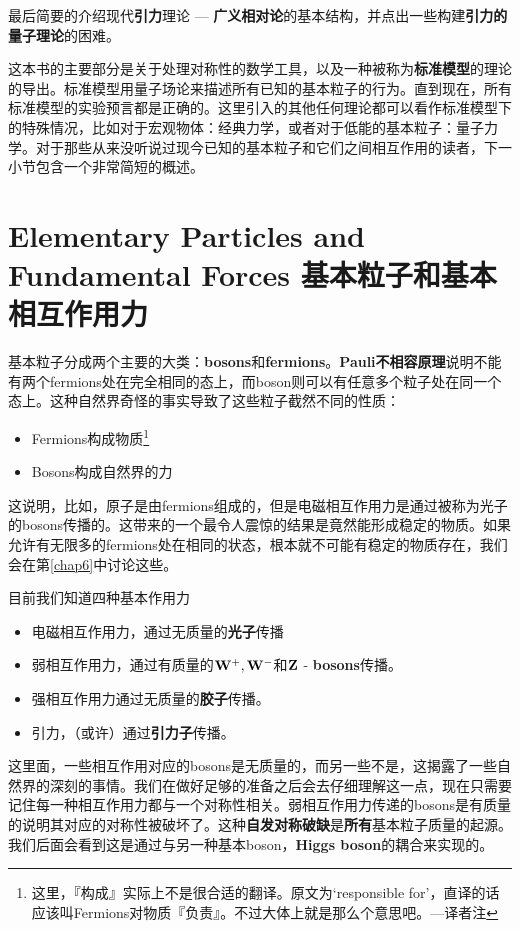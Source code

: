 最后简要的介绍现代{\bf 引力}理论 --- {\bf 广义相对论}的基本结构，并点出一些构建{\bf 引力的量子理论}的困难。

这本书的主要部分是关于处理对称性的数学工具，以及一种被称为{\bf 标准模型}的理论的导出。标准模型用量子场论来描述所有已知的基本粒子的行为。直到现在，所有标准模型的实验预言都是正确的。这里引入的其他任何理论都可以看作标准模型下的特殊情况，比如对于宏观物体：经典力学，或者对于低能的基本粒子：量子力学。对于那些从来没听说过现今已知的基本粒子和它们之间相互作用的读者，下一小节包含一个非常简短的概述。

\section[基本粒子和基本相互作用力]{Elementary Particles and Fundamental Forces 基本粒子和基本相互作用力}\label{sec1.3}

基本粒子分成两个主要的大类：{\bf bosons}和{\bf fermions}。{\bf Pauli不相容原理}说明不能有两个fermions处在完全相同的态上，而boson则可以有任意多个粒子处在同一个态上。这种自然界奇怪的事实导致了这些粒子截然不同的性质：

\begin{itemize}
\item Fermions构成物质\footnote{这里，『构成』实际上不是很合适的翻译。原文为`responsible for'，直译的话应该叫Fermions对物质『负责』。不过大体上就是那么个意思吧。---译者注}
\item Bosons构成自然界的力
\end{itemize}

这说明，比如，原子是由fermions组成的，但是电磁相互作用力是通过被称为光子的bosons传播的。这带来的一个最令人震惊的结果是竟然能形成稳定的物质。如果允许有无限多的fermions处在相同的状态，根本就不可能有稳定的物质存在，我们会在第\ref{chap6}中讨论这些。

目前我们知道四种基本作用力

\begin{itemize}
\item 电磁相互作用力，通过无质量的{\bf 光子}传播
\item 弱相互作用力，通过有质量的$\bf W^+, W^-$和$\bf Z$ - {\bf bosons}传播。
\item 强相互作用力通过无质量的{\bf 胶子}传播。
\item 引力，（或许）通过{\bf 引力子}传播。
\end{itemize}

这里面，一些相互作用对应的bosons是无质量的，而另一些不是，这揭露了一些自然界的深刻的事情。我们在做好足够的准备之后会去仔细理解这一点，现在只需要记住每一种相互作用力都与一个对称性相关。弱相互作用力传递的bosons是有质量的说明其对应的对称性被破坏了。这种{\bf 自发对称破缺}是{\bf 所有}基本粒子质量的起源。我们后面会看到这是通过与另一种基本boson，{\bf Higgs boson}的耦合来实现的。


